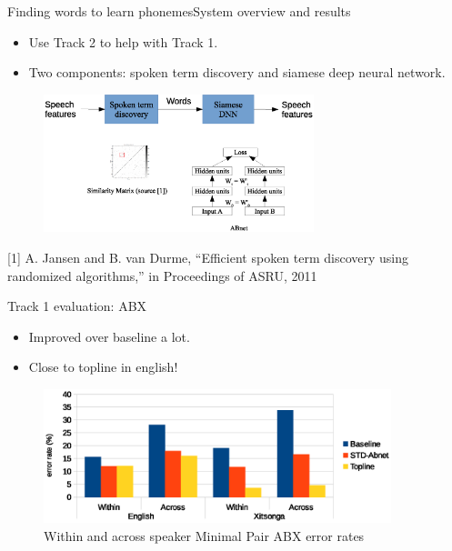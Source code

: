 \documentclass{beamer}
\begin{document}
\begin{frame}{Finding words to learn phonemes}{System overview and results}
  \begin{itemize}
  \item {
    Use Track 2 to help with Track 1.
  }
  \item {
    Two components: spoken term discovery and siamese deep neural network.
  }
  \end{itemize}
\begin{figure}
  \includegraphics[width=0.7\textwidth]{system_presentation.eps}
\end{figure}

\tiny
[1] A. Jansen and B. van Durme, “Efficient spoken term discovery using
randomized algorithms,” in Proceedings of ASRU, 2011

\end{frame}


\begin{frame}{Track 1 evaluation: ABX}
  \begin{itemize}
  \item {
      Improved over baseline a lot.
  }
  \item {
    Close to topline in english!
  }
  \end{itemize}
\begin{figure}
  \includegraphics[width=0.9\textwidth]{results.eps}
  \caption{ Within and across speaker Minimal Pair ABX error rates}
\end{figure}
\end{frame}
\end{document}

